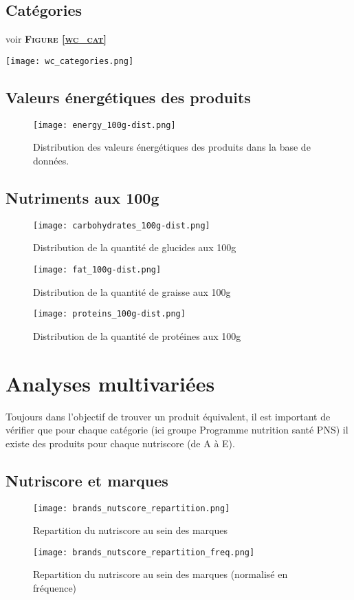   \subsection{Catégories}
  voir \textsc{\bf{Figure \ref{wc_cat}}}
  \begin{figure*}
    \texttt{[image: wc\_categories.png]}
    \caption{Les catégories présentent dans la base de données sous forme de
    nuage de mot (wordcloud)}
    \label{wc_cat}
  \end{figure*}

  \subsection{Valeurs énergétiques des produits}
  \begin{figure}[H]
    \texttt{[image: energy\_100g-dist.png]}
    \caption{Distribution des valeurs énergétiques des produits dans la base
    de données.}
    \label{}
  \end{figure}

  \subsection{Nutriments aux 100g}
  \begin{figure}[H]
    \texttt{[image: carbohydrates\_100g-dist.png]}
    \caption{Distribution de la quantité de glucides aux 100g}
    \label{}
  \end{figure}

  \begin{figure}[H]
    \texttt{[image: fat\_100g-dist.png]}
    \caption{Distribution de la quantité de graisse aux 100g}
    \label{}
  \end{figure}
  \begin{figure}[H]
    \texttt{[image: proteins\_100g-dist.png]}
    \caption{Distribution de la quantité de protéines aux 100g}
    \label{}
  \end{figure}


\section{Analyses multivariées}
Toujours dans l'objectif de trouver un produit équivalent, il est important
de vérifier que pour chaque catégorie (ici groupe Programme nutrition santé PNS)
il existe des produits pour chaque nutriscore (de A à E).

  \subsection{Nutriscore et marques}
    \begin{figure}[H]
      \texttt{[image: brands\_nutscore\_repartition.png]}
      \caption{Repartition du nutriscore au sein des marques}
      \label{}
    \end{figure}
    \begin{figure}[H]
      \texttt{[image: brands\_nutscore\_repartition\_freq.png]}
      \caption{Repartition du nutriscore au sein des marques (normalisé en fréquence)}
      \label{}
    \end{figure}

